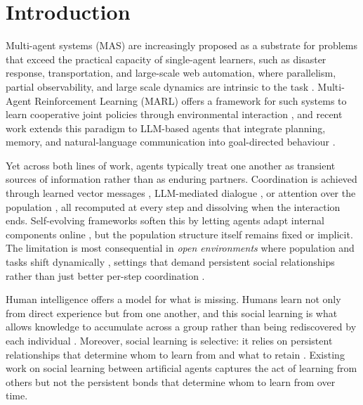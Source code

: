 \section{Introduction}
\label{intro}

Multi-agent systems (MAS) are increasingly proposed as a substrate for problems that exceed the practical capacity of single-agent learners, such as disaster response, transportation, and large-scale web automation, where parallelism, partial observability, and large scale dynamics are intrinsic to the task \cite{yuan2023survey, wong2023deep}. Multi-Agent Reinforcement Learning (MARL) offers a framework for such systems to learn cooperative joint policies through environmental interaction \cite{yuan2023survey, oroojlooy2023review}, and recent work extends this paradigm to LLM-based agents that integrate planning, memory, and natural-language communication into goal-directed behaviour \cite{xi2025rise, sun2024llm}.

Yet across both lines of work, agents typically treat one another as transient sources of information rather than as enduring partners. Coordination is achieved through learned vector messages \cite{zhu2024survey}, LLM-mediated dialogue \cite{sun2024llm}, or attention over the population \cite{iqbal2019actor}, all recomputed at every step and dissolving when the interaction ends. Self-evolving frameworks soften this by letting agents adapt internal components online \cite{fang2025comprehensive, gao2025survey}, but the population structure itself remains fixed or implicit. The limitation is most consequential in \emph{open environments} where population and tasks shift dynamically \cite{yuan2023survey}, settings that demand persistent social relationships rather than just better per-step coordination \cite{licua2025mindforge}.

Human intelligence offers a model for what is missing. Humans learn not only from direct experience but from one another, and this social learning is what allows knowledge to accumulate across a group rather than being rediscovered by each individual \cite{tomasello1993cultural, hoppitt2013social, boyd2011cultural}. Moreover, social learning is selective: it relies on persistent relationships that determine whom to learn from and what to retain \cite{kendal2018social}. Existing work on social learning between artificial agents \cite{ndousse2021emergent, hillier2024social} captures the act of learning from others but not the persistent bonds that determine whom to learn from over time.

